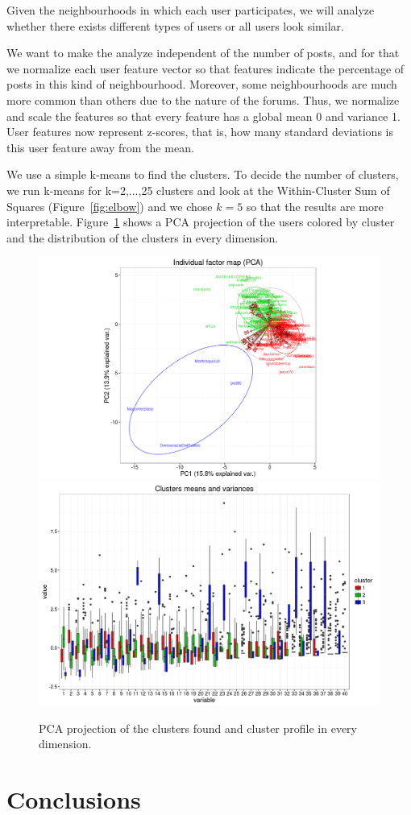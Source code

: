 \documentclass[9pt,technote]{IEEEtran}
\begin{document}
Given the neighbourhoods in which each user participates, we will analyze whether there exists different types of users or all users look similar.

We want to make the analyze independent of the number of posts, and for that we normalize each user feature vector so that features indicate the percentage of posts in this kind of neighbourhood. Moreover, some neighbourhoods are much more common than others due to the nature of the forums. Thus, we normalize and scale the features so that every feature has a global mean 0 and variance 1. User features now represent z-scores, that is, how many standard deviations is this user feature away from the mean.

We use a simple k-means to find the clusters. To decide the number of clusters, we run k-means for k=2,...,25 clusters and look at the Within-Cluster Sum of Squares (Figure~\ref{fig:elbow}) and we chose $k=5$ so that the results are more interpretable.  Figure~\ref{fig:PCA} shows a PCA projection of the users colored by cluster and the distribution of the clusters in every dimension.



\begin{figure}
	\centering
	\includegraphics[width=1\textwidth]{PCA_clustering_3_4_order}
	\includegraphics[width=1\textwidth]{clustering_3_4_order}
	\caption{PCA projection of the clusters found and cluster profile in every dimension.}
	\label{fig:PCA}
\end{figure}


\section{Conclusions}


 
% 
% 

\end{document}
